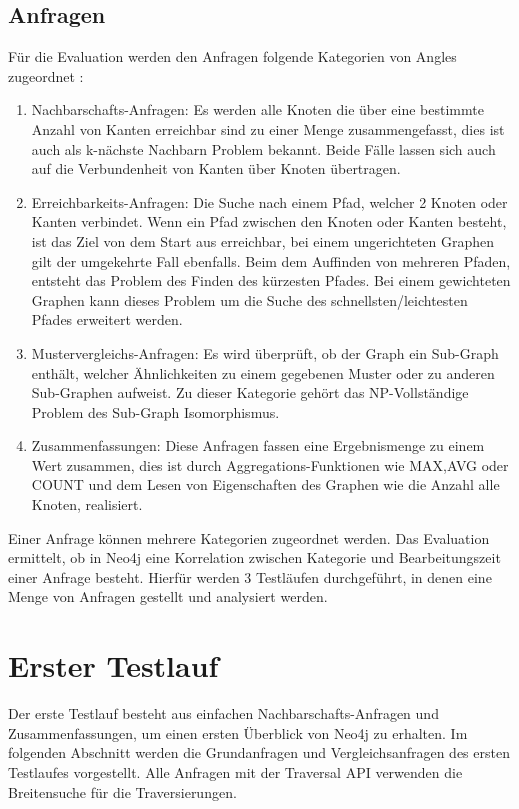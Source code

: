 \subsection{Anfragen} \label{Kategorien}
Für die Evaluation werden den Anfragen folgende Kategorien von Angles zugeordnet \parencite{angles2012comparison}:  
\begin{enumerate}
	\item Nachbarschafts-Anfragen: Es werden alle Knoten die über eine bestimmte Anzahl von Kanten erreichbar sind zu einer Menge zusammengefasst, dies ist auch als k-nächste Nachbarn Problem bekannt. Beide Fälle lassen sich auch auf die Verbundenheit von Kanten über Knoten übertragen.
	\item Erreichbarkeits-Anfragen: Die Suche nach einem Pfad, welcher 2 Knoten oder Kanten verbindet. Wenn ein Pfad zwischen den Knoten oder Kanten besteht, ist das Ziel von dem Start aus erreichbar, bei einem ungerichteten Graphen gilt der umgekehrte Fall ebenfalls. Beim dem Auffinden von mehreren Pfaden, entsteht das Problem des Finden des kürzesten Pfades. Bei einem gewichteten Graphen kann dieses Problem um die Suche des schnellsten/leichtesten Pfades  erweitert werden. 
	\item Mustervergleichs-Anfragen: Es wird überprüft, ob der Graph ein Sub-Graph enthält, welcher Ähnlichkeiten zu einem gegebenen Muster oder zu anderen Sub-Graphen aufweist. Zu dieser Kategorie gehört das NP-Vollständige Problem des Sub-Graph Isomorphismus. 
	\item Zusammenfassungen: Diese Anfragen fassen eine Ergebnismenge zu einem Wert zusammen, dies ist durch Aggregations-Funktionen wie MAX,AVG oder COUNT und dem Lesen von Eigenschaften des Graphen wie die Anzahl alle Knoten, realisiert. 
\end{enumerate}
Einer Anfrage können mehrere Kategorien zugeordnet werden. Das Evaluation ermittelt, ob in Neo4j eine Korrelation zwischen Kategorie und Bearbeitungszeit einer Anfrage besteht. Hierfür werden 3 Testläufen durchgeführt, in denen eine Menge von Anfragen gestellt und analysiert werden. 
\section{Erster Testlauf}
Der erste Testlauf besteht aus einfachen Nachbarschafts-Anfragen und Zusammenfassungen, um einen ersten Überblick von Neo4j zu erhalten. Im folgenden Abschnitt werden die Grundanfragen und Vergleichsanfragen des ersten Testlaufes vorgestellt. Alle Anfragen mit der Traversal API verwenden die Breitensuche für die Traversierungen. 
